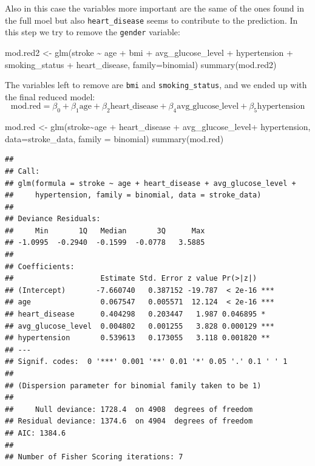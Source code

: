 \documentclass[
]{article}
\newenvironment{Shaded}{\begin{snugshade}}{\end{snugshade}}
\newcommand{\AttributeTok}[1]{\textcolor[rgb]{0.77,0.63,0.00}{#1}}
\newcommand{\FunctionTok}[1]{\textcolor[rgb]{0.00,0.00,0.00}{#1}}
\newcommand{\NormalTok}[1]{#1}
\newcommand{\OtherTok}[1]{\textcolor[rgb]{0.56,0.35,0.01}{#1}}
\newcommand{\SpecialCharTok}[1]{\textcolor[rgb]{0.00,0.00,0.00}{#1}}
\begin{document}
Also in this case the variables more important are the same of the ones
found in the full moel but also \texttt{heart\_disease} seems to
contribute to the prediction. In this step we try to remove the
\texttt{gender} variable:

\begin{Shaded}
\begin{Highlighting}[]
\NormalTok{mod.red2 }\OtherTok{\textless{}{-}} \FunctionTok{glm}\NormalTok{(stroke }\SpecialCharTok{\textasciitilde{}}\NormalTok{ age }\SpecialCharTok{+}\NormalTok{ bmi }\SpecialCharTok{+}\NormalTok{ avg\_glucose\_level }\SpecialCharTok{+}\NormalTok{ hypertension }\SpecialCharTok{+} 
\NormalTok{                  smoking\_status  }\SpecialCharTok{+}\NormalTok{ heart\_disease, }\AttributeTok{family=}\NormalTok{binomial) }
\FunctionTok{summary}\NormalTok{(mod.red2)}
\end{Highlighting}
\end{Shaded}

The variables left to remove are \texttt{bmi} and
\texttt{smoking\_status}, and we ended up with the final reduced model:
\[\text{mod.red} =\beta_0 + \beta_1\text{age} + \beta_2\text{heart_disease} + \beta_4  \text{avg_glucose_level}+ \beta_5\text{hypertension}\]

\begin{Shaded}
\begin{Highlighting}[]
\NormalTok{mod.red }\OtherTok{\textless{}{-}} \FunctionTok{glm}\NormalTok{(stroke}\SpecialCharTok{\textasciitilde{}}\NormalTok{age }\SpecialCharTok{+}\NormalTok{ heart\_disease }\SpecialCharTok{+}\NormalTok{ avg\_glucose\_level}\SpecialCharTok{+}\NormalTok{ hypertension, }
               \AttributeTok{data=}\NormalTok{stroke\_data, }\AttributeTok{family =}\NormalTok{ binomial)}
\FunctionTok{summary}\NormalTok{(mod.red)}
\end{Highlighting}
\end{Shaded}

\begin{verbatim}
## 
## Call:
## glm(formula = stroke ~ age + heart_disease + avg_glucose_level + 
##     hypertension, family = binomial, data = stroke_data)
## 
## Deviance Residuals: 
##     Min       1Q   Median       3Q      Max  
## -1.0995  -0.2940  -0.1599  -0.0778   3.5885  
## 
## Coefficients:
##                    Estimate Std. Error z value Pr(>|z|)    
## (Intercept)       -7.660740   0.387152 -19.787  < 2e-16 ***
## age                0.067547   0.005571  12.124  < 2e-16 ***
## heart_disease      0.404298   0.203447   1.987 0.046895 *  
## avg_glucose_level  0.004802   0.001255   3.828 0.000129 ***
## hypertension       0.539613   0.173055   3.118 0.001820 ** 
## ---
## Signif. codes:  0 '***' 0.001 '**' 0.01 '*' 0.05 '.' 0.1 ' ' 1
## 
## (Dispersion parameter for binomial family taken to be 1)
## 
##     Null deviance: 1728.4  on 4908  degrees of freedom
## Residual deviance: 1374.6  on 4904  degrees of freedom
## AIC: 1384.6
## 
## Number of Fisher Scoring iterations: 7
\end{verbatim}
\end{document}

